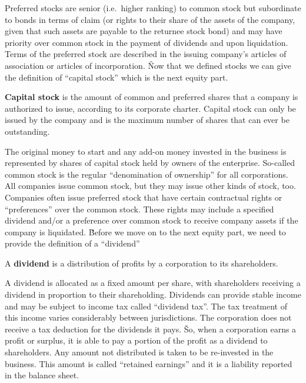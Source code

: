 Preferred stocks are senior (i.e.\ higher ranking) to common stock but subordinate to bonds in terms of claim (or
rights to their share of the assets of the company, given that such assets are payable to the returnee stock bond)
and may have priority over common stock in the payment of dividends and upon liquidation. Terms of the preferred
stock are described in the issuing company's articles of association or articles of incorporation. \v

Now that we defined stocks we can give the definition of ``capital stock'' which is the next equity part.

\textbf{Capital stock} is the amount of common and preferred shares that a company is authorized to issue, according
to its corporate charter. Capital stock can only be issued by the company and is the maximum number of shares that
can ever be outstanding.
\ed

The original money to start and any add-on money invested in the business is represented by shares of capital stock
held by owners of the enterprise. So-called common stock is the regular ``denomination of ownership'' for all
corporations. All companies issue common stock, but they may issue other kinds of stock, too. Companies often issue
preferred stock that have certain contractual rights or ``preferences'' over the common stock. These rights may include
a specified dividend and/or a preference over common stock to receive company assets if the company is liquidated. \v

Before we move on to the next equity part, we need to provide the definition of a ``dividend''

\bd[Dividend]
A \textbf{dividend} is a distribution of profits by a corporation to its shareholders.
\ed

A dividend is allocated as a fixed amount per share, with shareholders receiving a dividend in proportion to their
shareholding. Dividends can provide stable income and may be subject to income tax called ``dividend
tax''. The tax treatment of this income varies considerably between jurisdictions. The corporation does not receive a
tax deduction for the dividends it pays. \v

So, when a corporation earns a profit or surplus, it is able to pay a portion of the profit as a dividend to
shareholders. Any amount not distributed is taken to be re-invested in the business. This amount is called ``retained
earnings'' and it is a liability reported in the balance sheet.


